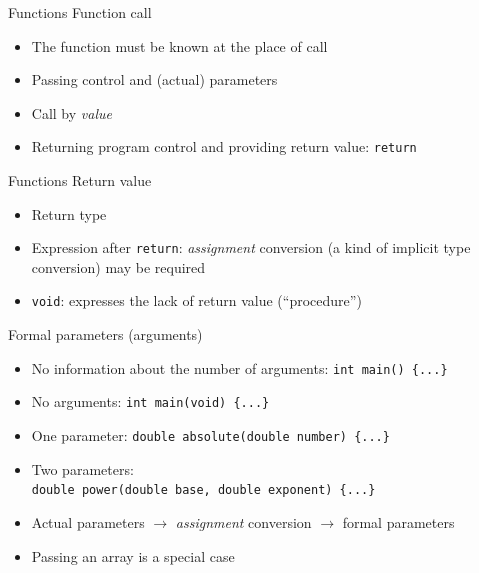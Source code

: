 \documentclass[usenames,dvipsnames,aspectratio=169]{beamer}
\begin{document}
\begin{frame}{Functions}
  Function call
  \begin{itemize}
    \item The function must be known at the place of call
    \item Passing control and (actual) parameters
    \item Call by \emph{value}
    \item Returning program control and providing return value: \texttt{return}
  \end{itemize}
  \begin{exampleblock}{}
    \footnotesize
    \vspace{-.3cm}
    
    \vspace{-.3cm}
  \end{exampleblock}
\end{frame}

\begin{frame}{Functions}
  Return value
  \begin{itemize}
    \item Return type 
    \item Expression after \texttt{return}: \emph{assignment} conversion (a kind of implicit type conversion) may be required
    \item \texttt{void}: expresses the lack of return value (``procedure'')
  \end{itemize}
  Formal parameters (arguments)
  \begin{itemize}
    \item No information about the number of arguments: \texttt{int main() \{...\}}
    \item No arguments: \texttt{int main(void) \{...\}}
    \item One parameter: \texttt{double absolute(double number) \{...\}}
    \item Two parameters: \\ \texttt{double power(double base, double exponent) \{...\}}
    \item Actual parameters $\to$ \emph{assignment} conversion $\to$ formal parameters
    \item Passing an array is a special case
  \end{itemize}
\end{frame}
\end{document}

